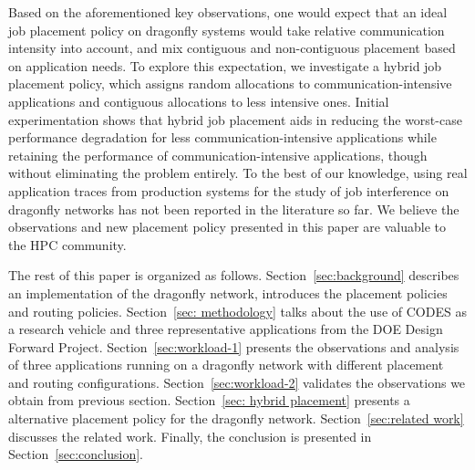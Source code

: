 Based on the aforementioned key observations, one would expect that an ideal job placement policy on dragonfly systems would take relative communication intensity into account, and mix contiguous and non-contiguous placement based on application needs. To explore this expectation, we investigate a hybrid job placement policy, which assigns random allocations to communication-intensive applications and contiguous allocations to less intensive ones. Initial experimentation shows that hybrid job placement aids in reducing the worst-case performance degradation for less communication-intensive applications while retaining the performance of communication-intensive applications, though without eliminating the problem entirely.
To the best of our knowledge, using real application traces from production systems for the study of job interference on dragonfly networks has not been reported in the literature so far. We believe the observations and new placement policy presented in this paper are valuable to the HPC community.


The rest of this paper is organized as follows. Section~\ref{sec:background} describes an implementation of the dragonfly network, introduces the placement policies and routing policies. Section~\ref{sec: methodology} talks about the use of CODES as a research vehicle and three representative applications from the DOE Design Forward Project. Section~\ref{sec:workload-1} presents the observations and analysis of three applications running on a dragonfly network with different placement and routing configurations. Section~\ref{sec:workload-2} validates the observations we obtain from previous section. Section~\ref{sec: hybrid placement} presents a alternative placement policy for the dragonfly network. Section~\ref{sec:related work} discusses the related work. Finally, the conclusion is presented in Section~\ref{sec:conclusion}.


